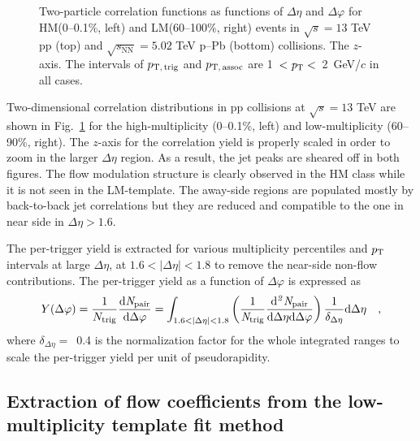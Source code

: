 \begin{figure}[h!]
\caption{Two-particle correlation functions as functions of $\Delta\eta$ and $\Delta\varphi$ for HM(0--0.1\%, left) and LM(60--100\%, right) events in $\sqrt{s}=13$ TeV pp (top) and $\sqrt{s_{\mathrm{NN}}}=5.02$ TeV p--Pb (bottom) collisions. The $z$-axis. The intervals of $p_\mathrm{T,\,trig}$ and $p_\mathrm{T,\,assoc}$ are 1~$<\it{p}_{\rm{T}}<$~2~GeV/$c$ in all cases.}
\label{fig:doubleridge}
\end{figure}

Two-dimensional correlation distributions in pp collisions at $\sqrt{s}=13$ TeV are shown in Fig.~\ref{fig:doubleridge} for the high-multiplicity (0--0.1\%, left) and low-multiplicity (60--90\%, right). 
The $z$-axis for the correlation yield is properly scaled in order to zoom in the larger $\Delta\eta$ region. As a result, the jet peaks are sheared off in both figures. The flow modulation structure is clearly observed in the HM class while it is not seen in the LM-template. The away-side regions are populated mostly by back-to-back jet correlations but they are reduced and compatible to the one in near side in $\Delta\eta > 1.6$.

The per-trigger yield is extracted for various multiplicity percentiles and $p_\mathrm{T}$ intervals at large $\Delta\eta$, at $1.6<|\Delta\eta|<1.8$ to remove the near-side non-flow contributions. The per-trigger yield as a function of $\Delta\varphi$ is expressed as
\begin{eqnarray}
Y(\Delta\varphi) = \frac{1}{N_{\rm{trig}}} \frac{ \rm{d}\it{}N_{\rm{pair}} }{ \rm{d}\Delta\varphi } = \int_{1.6<|\Delta \eta|<1.8} \left( \frac{1}{\it{N}_{\rm{trig}}} \frac{ \rm{d}\it{}^{2} N_{\rm{pair}} }{ \rm{d}\Delta\eta \rm{d}\Delta\varphi} \right) \dfrac{1}{\delta_{\Delta\eta}} \rm{d}\Delta \eta \quad ,
\label{eq:pertrigger}
\end{eqnarray}
where $\delta_{\Delta\eta}=$~0.4 is the normalization factor for the whole integrated ranges to scale the per-trigger yield per unit of pseudorapidity. 


\subsection{Extraction of flow coefficients from the low-multiplicity template fit method}

